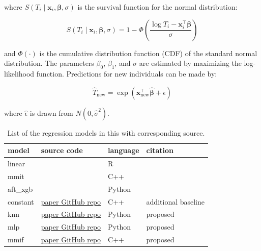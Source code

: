 \documentclass[12pt]{article}
\begin{document}
where $S(T_i \mid \mathbf{x}_i, \boldsymbol{\beta}, \sigma)$ is the survival function for the normal distribution:

\begin{equation*}
    S(T_i \mid \mathbf{x}_i, \boldsymbol{\beta}, \sigma) = 1 - \Phi\left( \frac{\log T_i - \mathbf{x}_i^\top \boldsymbol{\beta}}{\sigma} \right)
\end{equation*}

and $\Phi(\cdot)$ is the cumulative distribution function (CDF) of the standard normal distribution.
\newline
\newline
\noindent The parameters $\beta_0$, $\beta_1$, and $\sigma$ are estimated by maximizing the log-likelihood function. Predictions for new individuals can be made by:

\begin{equation*}
    \hat{T}_{\text{new}} = \exp(\mathbf{x}_{\text{new}}^\top \hat{\boldsymbol{\beta}} + \hat{\epsilon})
\end{equation*}

where $\hat{\epsilon}$ is drawn from $N(0, \hat{\sigma}^2)$.

\begin{table}[!t] 
\centering
\begin{tabular}{l|l|l|l} 
\toprule
\textbf{model} & \textbf{source code} & \textbf{language} & \textbf{citation} \\ \midrule
linear                 & \citep{penaltyLearning} & R                                      & \citep{rigaill:13}             \\ 
mmit                   & \citep{mmit} & C++                     & \citep{mmit}                           \\ 
aft\_xgb               & \citep{xgb_package} & Python                                 & \citep{aft_xgboost}                    \\ \midrule
constant                    & \href{https://github.com/lamtung16/ML_IntervalRegression}{paper GitHub repo} & C++                                 & additional baseline                               \\ \midrule
knn                    & \href{https://github.com/lamtung16/ML_IntervalRegression}{paper GitHub repo} & Python                                 & proposed                               \\ 
mlp                    &\href{https://github.com/lamtung16/ML_IntervalRegression}{paper GitHub repo}& Python                                 & proposed                               \\ 
mmif                   &\href{https://github.com/lamtung16/ML_IntervalRegression}{paper GitHub repo}& C++                     & proposed                               \\ 
\bottomrule
\end{tabular}
\caption{List of the regression models in this with corresponding source.}
\label{tab:models_list_rnn}
\end{table}
\end{document}
